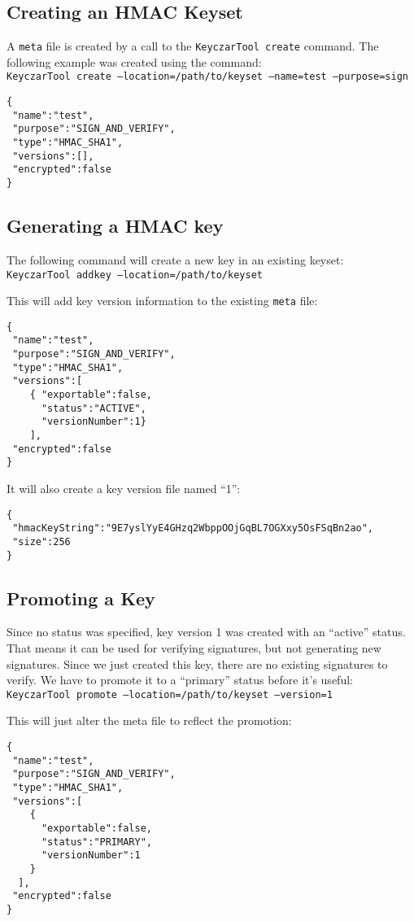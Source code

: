 \documentclass{llncs}
\begin{document}
\subsection{Creating an HMAC Keyset}
A {\tt meta} file is created by a call to the {\tt KeyczarTool create} command.
The following example was created using the command: \\
{\tt KeyczarTool create --location=/path/to/keyset --name=test --purpose=sign}

\begin{verbatim}
{
 "name":"test",
 "purpose":"SIGN_AND_VERIFY",
 "type":"HMAC_SHA1",
 "versions":[],
 "encrypted":false
}
\end{verbatim}

\subsection{Generating a HMAC key}

The following command will create a new key in an existing keyset: \\
{\tt KeyczarTool addkey --location=/path/to/keyset}

This will add key version information to the existing {\tt meta} file: 
\begin{verbatim}
{
 "name":"test",
 "purpose":"SIGN_AND_VERIFY",
 "type":"HMAC_SHA1",
 "versions":[
    { "exportable":false,
      "status":"ACTIVE",
      "versionNumber":1}
    ],
 "encrypted":false
}
\end{verbatim}

It will also create a key version file named ``1'':
\begin{verbatim}
{
 "hmacKeyString":"9E7yslYyE4GHzq2WbppOOjGqBL7OGXxy5OsFSqBn2ao",
 "size":256
}
\end{verbatim}

\subsection{Promoting a Key}
Since no status was specified, key version 1 was created with an ``active''
status. That means it can be used for verifying signatures, but not generating
new signatures. Since we just created this key, there are no existing
signatures to verify. We have to promote it to a ``primary'' status before
it's useful: \\
{\tt KeyczarTool promote --location=/path/to/keyset --version=1}

This will just alter the meta file to reflect the promotion:
\begin{verbatim}
{
 "name":"test",
 "purpose":"SIGN_AND_VERIFY",
 "type":"HMAC_SHA1",
 "versions":[
    { 
      "exportable":false,
      "status":"PRIMARY",
      "versionNumber":1
    }
  ],
 "encrypted":false
}
\end{verbatim}
\end{document}
